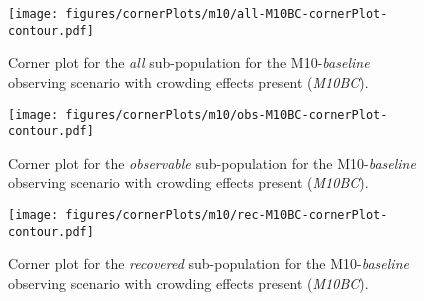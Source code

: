 \documentclass[twocolumn]{aastex63}
\begin{document}
\begin{figure}
    \centering
    \texttt{[image: figures/cornerPlots/m10/all-M10BC-cornerPlot-contour.pdf]}
    \caption{Corner plot for the \textit{all} sub-population for the M10-\textit{baseline} observing scenario with crowding effects present (\textit{M10BC}).}
    \label{fig:m10bc-All-corner-plot-appendix}
\end{figure}\clearpage

\begin{figure}
    \centering
    \texttt{[image: figures/cornerPlots/m10/obs-M10BC-cornerPlot-contour.pdf]}
    \caption{Corner plot for the \textit{observable} sub-population for the M10-\textit{baseline} observing scenario with crowding effects present (\textit{M10BC}).}
    \label{fig:m10bc-Obs-corner-plot-appendix}
\end{figure}\clearpage

\begin{figure}
    \centering
    \texttt{[image: figures/cornerPlots/m10/rec-M10BC-cornerPlot-contour.pdf]}
    \caption{Corner plot for the \textit{recovered} sub-population for the M10-\textit{baseline} observing scenario with crowding effects present (\textit{M10BC}).}
    \label{fig:m10bc-Rec-corner-plot-appendix}
\end{figure}\clearpage
\end{document}
